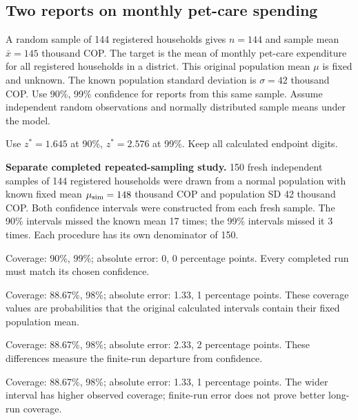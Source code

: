 \subsection{Two reports on monthly pet-care spending}
\label{prob:c2-2}

A random sample of 144 registered households gives $n=144$ and sample mean $\bar{x}=145$ thousand COP. The target is the mean of monthly pet-care expenditure for all registered households in a district. This original population mean $\mu$ is fixed and unknown. The known population standard deviation is $\sigma=42$ thousand COP. Use 90\%, 99\% confidence for reports from this same sample. Assume independent random observations and normally distributed sample means under the model.

Use $z^*=1.645$ at 90\%, $z^*=2.576$ at 99\%. Keep all calculated endpoint digits.

\textbf{Separate completed repeated-sampling study.} 150 fresh independent samples of 144 registered households were drawn from a normal population with known fixed mean $\mu_{\rm sim}=148$ thousand COP and population SD 42 thousand COP. Both confidence intervals were constructed from each fresh sample.
The 90\% intervals missed the known mean 17 times; the 99\% intervals missed it 3 times. Each procedure has its own denominator of 150.

\begin{answeroptions}
\item Coverage: 90\%, 99\%; absolute error: 0, 0 percentage points. Every completed run must match its chosen confidence.
\item Coverage: 88.67\%, 98\%; absolute error: 1.33, 1 percentage points. These coverage values are probabilities that the original calculated intervals contain their fixed population mean.
\item Coverage: 88.67\%, 98\%; absolute error: 2.33, 2 percentage points. These differences measure the finite-run departure from confidence.
\item Coverage: 88.67\%, 98\%; absolute error: 1.33, 1 percentage points. The wider interval has higher observed coverage; finite-run error does not prove better long-run coverage.
\end{answeroptions}
\clearpage
